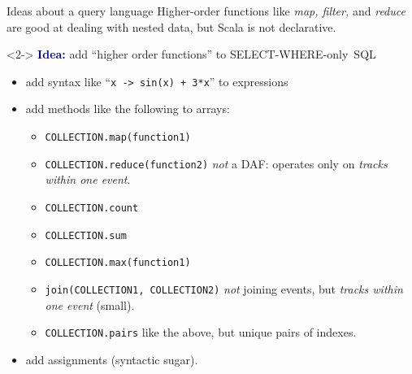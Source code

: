\documentclass{beamer}
\begin{document}
\begin{frame}{Ideas about a query language}
\vspace{0.25 cm}
Higher-order functions like {\it map, filter,} and {\it reduce} are good at dealing with nested data, but Scala is not declarative.

\vspace{0.25 cm}
\begin{uncoverenv}<2->
\textcolor{darkblue}{\bf Idea:} add ``higher order functions'' to \mbox{SELECT-WHERE-only SQL\hspace{-1 cm}}
\begin{itemize}
\item add syntax like ``{\tt x -> sin(x) + 3*x}'' to expressions
\item add methods like the following to arrays:
\begin{itemize}
\item {\tt \scriptsize COLLECTION.map(function1)}
\item {\tt \scriptsize COLLECTION.reduce(function2)} {\it not} a DAF: operates only on {\it tracks within one event}.
\item {\tt \scriptsize COLLECTION.count}
\item {\tt \scriptsize COLLECTION.sum}
\item {\tt \scriptsize COLLECTION.max(function1)}
\item {\tt \scriptsize join(COLLECTION1, COLLECTION2)} {\it not} joining events, but {\it tracks within one event} (small).
\item {\tt \scriptsize COLLECTION.pairs} like the above, but unique pairs of indexes.
\end{itemize}
\item add assignments (syntactic sugar).
\end{itemize}
\end{uncoverenv}
\end{frame}
\end{document}
